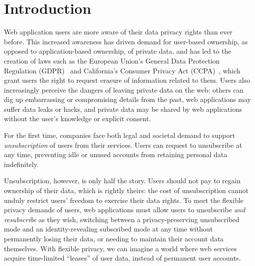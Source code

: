 \section{Introduction}

Web application users are more aware of their data privacy rights than ever before. 
%
This increased awareness has driven demand for user-based ownership, as opposed to application-based
ownership, of private data, and has led to the creation of laws such as the European Union's General
Data Protection Regulation (GDPR)~\cite{eu:gdpr} and California's Consumer Privacy Act
(CCPA)~\cite{ca:privacy-act}, which grant users the right to request erasure of information related
to them.
%
Users also increasingly perceive the dangers of leaving private data on the
web: others can dig up embarrassing or compromising details from the past, web applications may
suffer data leaks or hacks, and private data may be shared by web applications without the user's
knowledge or explicit consent\cite{nytimes_fb, npr_data}.
%

%
For the first time, companies face both legal and societal demand to support \emph{unsubscription}
of users from their services. Users can request to unsubscribe at any time, preventing 
idle or unused accounts from retaining personal data indefinitely. 
%

%
Unsubscription, however, is only half the story. Users should not pay to regain ownership of their
data, which is rightly theirs: the cost of unsubscription cannot unduly restrict users' freedom to exercise their data
rights. To meet the flexible privacy demands of users, web applications must allow users to
unsubscribe \emph{and resubscribe} as they wish, switching between a privacy-preserving unsubscribed
mode and an identity-revealing subscribed mode at any time without permanently losing their data, or
needing to maintain their account data themselves. 
%
With flexible privacy, we can imagine a world where web services acquire time-limited ``leases'' of user
data, instead of permanent user accounts. 
%

